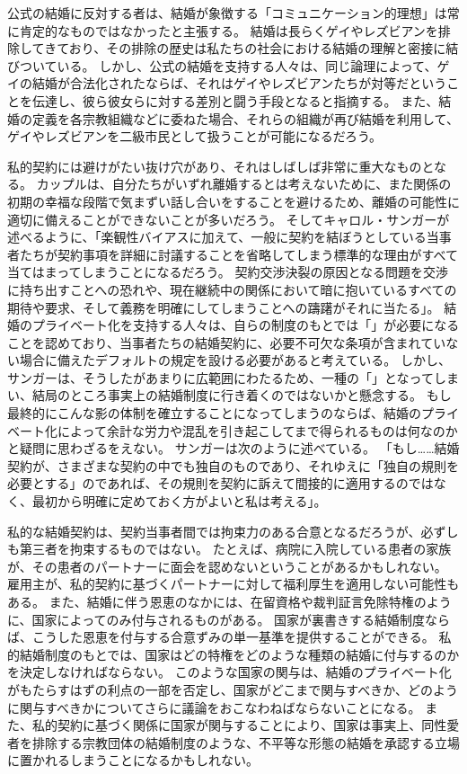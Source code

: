 \documentclass[paper=a4,book,openany]{jlreq}
\begin{document}
公式の結婚に反対する者は、結婚が象徴する「コミュニケーション的理想」は常に肯定的なものではなかったと主張する。
結婚は長らくゲイやレズビアンを排除してきており、その排除の歴史は私たちの社会における結婚の理解と密接に結びついている。
しかし、公式の結婚を支持する人々は、同じ論理によって、ゲイの結婚が合法化されたならば、それはゲイやレズビアンたちが対等だということを伝達し、彼ら彼女らに対する差別と闘う手段となると指摘する。
また、結婚の定義を各宗教組織などに委ねた場合、それらの組織が再び結婚を利用して、ゲイやレズビアンを二級市民として扱うことが可能になるだろう\citep[cf.][p.205]{hartley12:_polit_liber_marriag_famil}。

私的契約には避けがたい抜け穴があり、それはしばしば非常に重大なものとなる。
カップルは、自分たちがいずれ離婚するとは考えないために、また関係の初期の幸福な段階で気まずい話し合いをすることを避けるため、離婚の可能性に適切に備えることができないことが多いだろう。
そしてキャロル・サンガーが述べるように、「楽観性バイアスに加えて、一般に契約を結ぼうとしている当事者たちが契約事項を詳細に討議することを省略してしまう標準的な理由がすべて当てはまってしまうことになるだろう。
契約交渉決裂の原因となる問題を交渉に持ち出すことへの恐れや、現在継続中の関係において暗に抱いているすべての期待や要求、そして義務を明確にしてしまうことへの躊躇がそれに当たる」\citep[p.1315]{sanger06:_case_civil_marriag}。
結婚のプライベート化を支持する人々は、自らの制度のもとでは「」が必要になることを認めており、当事者たちの結婚契約に、必要不可欠な条項が含まれていない場合に備えたデフォルトの規定を設ける必要があると考えている。
しかし、サンガーは、そうしたがあまりに広範囲にわたるため、一種の「」となってしまい、結局のところ事実上の結婚制度に行き着くのではないかと懸念する。
もし最終的にこんな影の体制を確立することになってしまうのならば、結婚のプライベート化によって余計な労力や混乱を引き起こしてまで得られるものは何なのかと疑問に思わざるをえない。
サンガーは次のように述べている。
「もし……結婚契約が、さまざまな契約の中でも独自のものであり、それゆえに「独自の規則を必要とする」のであれば、その規則を契約に訴えて間接的に適用するのではなく、最初から明確に定めておく方がよいと私は考える」\citep[p.1315]{sanger06:_case_civil_marriag}。

私的な結婚契約は、契約当事者間では拘束力のある合意となるだろうが、必ずしも第三者を拘束するものではない。
たとえば、病院に入院している患者の家族が、その患者のパートナーに面会を認めないということがあるかもしれない。
雇用主が、私的契約に基づくパートナーに対して福利厚生を適用しない可能性もある。
また、結婚に伴う恩恵のなかには、在留資格や裁判証言免除特権のように、国家によってのみ付与されるものがある。
国家が裏書きする結婚制度ならば、こうした恩恵を付与する合意ずみの単一基準を提供することができる。
私的結婚制度のもとでは、国家はどの特権をどのような種類の結婚に付与するのかを決定しなければならない。
このような国家の関与は、結婚のプライベート化がもたらすはずの利点の一部を否定し、国家がどこまで関与すべきか、どのように関与すべきかについてさらに議論をおこなわねばならないことになる。
また、私的契約に基づく関係に国家が関与することにより、国家は事実上、同性愛者を排除する宗教団体の結婚制度のような、不平等な形態の結婚を承認する立場に置かれるしまうことになるかもしれない。
\end{document}
